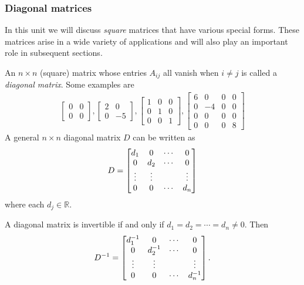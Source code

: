 \documentclass[12pt,letterpaper,reqno]{article}
\numberwithin{equation}{section}
\newcommand{\ti}[1]{\textit{#1}}
\begin{document}
\subsubsection{Diagonal matrices}
In this unit we will discuss \ti{square} matrices that have various special forms. These matrices arise in a wide variety of applications and will also play an important role in subsequent sections.

An $n \times n$ (square) matrix whose entries $A_{ij}$ all vanish when $i \neq j$ is called a \ti{diagonal matrix}. Some examples are
\begin{align*}
	\begin{bmatrix}
		0 & 0\\ 0 & 0
	\end{bmatrix}, \begin{bmatrix}
		2 & 0 \\ 0 & -5
	\end{bmatrix}, \begin{bmatrix}
		1 & 0 & 0 \\ 0 & 1 & 0 \\ 0 & 0 & 1
	\end{bmatrix}, \begin{bmatrix}
		6 & 0 & 0 & 0 \\ 0 & -4 & 0 & 0 \\ 0 & 0 & 0 & 0 \\ 0 & 0 & 0 & 8
	\end{bmatrix}
\end{align*}
A general $n \times n$ diagonal matrix $D$ can be written as 
\begin{equation}\label{eq:diagonal_matrix}
	D=\begin{bmatrix}
		d_1 & 0 & \cdots & 0 \\
		0 & d_2 & \cdots & 0 \\
		\vdots & \vdots & \hspace{0.25cm} & \vdots \\
		0 & 0 & \cdots & d_n
	\end{bmatrix}
\end{equation}
where each $d_j \in \mathbb{R}$.

A diagonal matrix is invertible if and only if $d_1=d_2=\cdots=d_n \neq 0$. Then
\begin{equation}\label{eq:inverse_diagonal_matrix}
	D^{-1}=\begin{bmatrix}
		d_1^{-1} & 0 & \cdots & 0 \\
		0 & d_2^{-1} & \cdots & 0 \\
		\vdots & \vdots & \hspace{0.25cm} & \vdots \\
		0 & 0 & \cdots & d_n^{-1}
	\end{bmatrix}.
\end{equation}
\end{document}
